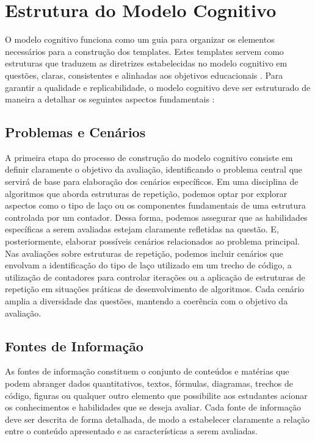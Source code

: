 \section{Estrutura do Modelo Cognitivo}

O modelo cognitivo funciona como um guia para organizar os elementos necessários para a construção dos templates. Estes templates servem como estruturas que traduzem as diretrizes estabelecidas no modelo cognitivo em questões, claras, consistentes e alinhadas aos objetivos educacionais \parencite{keehner2017, gierl2017}. Para garantir a qualidade e replicabilidade, o modelo cognitivo deve ser estruturado de maneira a detalhar os seguintes aspectos fundamentais : 

\subsection{Problemas e Cenários}

A primeira etapa do processo de construção do modelo cognitivo consiste em definir claramente o objetivo da avaliação, identificando o problema central que servirá de base para elaboração dos cenários específicos. Em uma disciplina de algoritmos que aborda estruturas de repetição, podemos optar por explorar aspectos como o tipo de laço ou os componentes fundamentais de uma estrutura controlada por um contador. Dessa forma, podemos assegurar que as habilidades específicas a serem avaliadas estejam claramente refletidas na questão. E, posteriormente, elaborar possíveis cenários relacionados ao problema principal. Nas avaliações sobre estruturas de repetição, podemos incluir cenários que envolvam a identificação do tipo de laço utilizado em um trecho de código, a utilização de contadores para controlar iterações ou a aplicação de estruturas de repetição em situações práticas de desenvolvimento de algoritmos. Cada cenário amplia a diversidade das questões, mantendo a coerência com o objetivo da avaliação.

\subsection{Fontes de Informação}

As fontes de informação constituem o conjunto de conteúdos e matérias que podem abranger dados quantitativos, textos, fórmulas, diagramas, trechos de código, figuras ou qualquer outro elemento que possibilite aos estudantes acionar os conhecimentos e habilidades que se deseja avaliar. Cada fonte de informação deve ser descrita de forma detalhada, de modo a estabelecer claramente a relação entre o conteúdo apresentado e as características a serem avaliadas.


